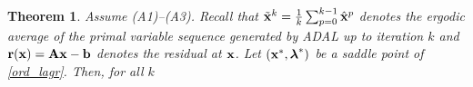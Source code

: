 \documentclass[doublecolumn]{IEEEtran}
\newtheorem{thm}{\bf \noindent Theorem}
\def\0b{\mathbf{0}}
\begin{document}
\begin{thm}\label{thm2}
Assume (A1)--(A3). Recall that ${ \tilde{\bf x} }^k = \frac{1}{k}\sum_{p=0}^{k-1} {\hat{\mathbf x}}^p $ denotes  the ergodic average of the primal variable sequence generated by ADAL up to iteration $k$
and ${ {\bf r} }({ {\bf x} }) = { {\bf A} }{ {\bf x} } - { {\bf b} }$ denotes the residual at ${ {\bf x} }$.
Let $({ {\bf x} }^*,{\boldsymbol{\lambda}}^*)$ be a saddle point of \eqref{ord_lagr}.
Then, for all $k$\vspace{2mm}
\end{thm}
\end{document}
